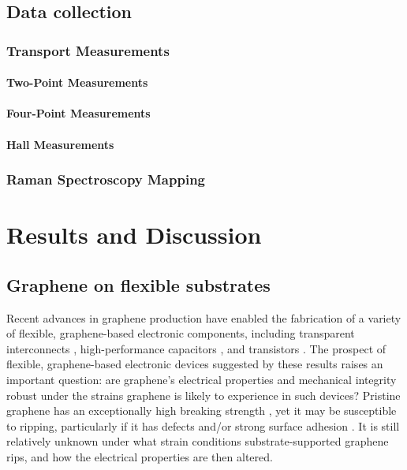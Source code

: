 \documentclass[edeposit,fullpage,draftthesis]{uiucthesis2009}
\begin{document}
    \section{Data collection}
        \subsection{Transport Measurements}
            \subsubsection*{Two-Point Measurements}
            \subsubsection*{Four-Point Measurements}
            \subsubsection*{Hall Measurements}
        \subsection{Raman Spectroscopy Mapping}
    
    
\chapter{Results and Discussion}

\section{Graphene on flexible substrates}
Recent advances in graphene production \cite{Kim2009, Bae2010, Lee2010} have enabled the fabrication of a variety of flexible, graphene-based electronic components, including transparent interconnects \cite{Kim2011}, high-performance capacitors \cite{El-Kady2012}, and transistors \cite{Lee2011}. The prospect of flexible, graphene-based electronic devices suggested by these results raises an important question: are graphene's electrical properties and mechanical integrity robust under the strains graphene is likely to experience in such devices? Pristine graphene has an exceptionally high breaking strength \cite{Lee2008}, yet it may be susceptible to ripping, particularly if it has defects \cite{Kim2012} and/or strong  surface adhesion \cite{Sen2010}. It is still relatively unknown under what strain conditions substrate-supported graphene rips, and how the electrical properties are then altered.
\end{document}
